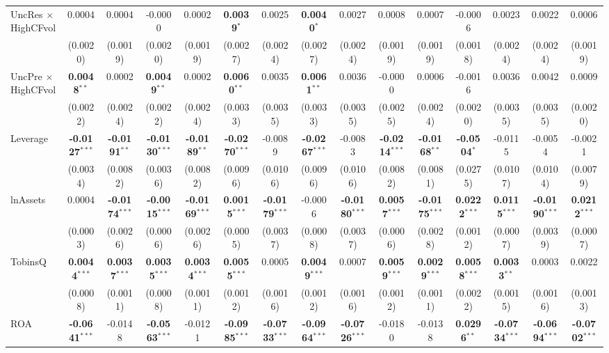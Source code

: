 \documentclass[11pt,a4paper]{article}
\begin{document}
\begin{table}[htbp]
\begin{tabular}{lcccccccccccccc}
UncRes $\times$ HighCFvol & 0.0004 & 0.0004 & -0.0000 & 0.0002 & \textbf{0.0039}$^{*}$ & 0.0025 & \textbf{0.0040}$^{*}$ & 0.0027 & 0.0008 & 0.0007 & -0.0006 & 0.0023 & 0.0022 & 0.0006 \\
 & (0.0020) & (0.0019) & (0.0020) & (0.0019) & (0.0027) & (0.0024) & (0.0027) & (0.0024) & (0.0019) & (0.0019) & (0.0018) & (0.0024) & (0.0024) & (0.0019) \\
UncPre $\times$ HighCFvol & \textbf{0.0048}$^{**}$ & 0.0002 & \textbf{0.0049}$^{**}$ & 0.0002 & \textbf{0.0060}$^{**}$ & 0.0035 & \textbf{0.0061}$^{**}$ & 0.0036 & -0.0000 & 0.0006 & -0.0016 & 0.0036 & 0.0042 & 0.0009 \\
 & (0.0022) & (0.0024) & (0.0022) & (0.0024) & (0.0033) & (0.0035) & (0.0033) & (0.0035) & (0.0025) & (0.0024) & (0.0020) & (0.0035) & (0.0035) & (0.0020) \\
\midrule
Leverage & \textbf{-0.0127}$^{***}$ & \textbf{-0.0191}$^{**}$ & \textbf{-0.0130}$^{***}$ & \textbf{-0.0189}$^{**}$ & \textbf{-0.0270}$^{***}$ & -0.0089 & \textbf{-0.0267}$^{***}$ & -0.0083 & \textbf{-0.0214}$^{***}$ & \textbf{-0.0168}$^{**}$ & \textbf{-0.0504}$^{*}$ & -0.0115 & -0.0054 & -0.0021 \\
 & (0.0034) & (0.0082) & (0.0036) & (0.0082) & (0.0096) & (0.0106) & (0.0096) & (0.0106) & (0.0082) & (0.0081) & (0.0275) & (0.0107) & (0.0104) & (0.0079) \\
lnAssets & 0.0004 & \textbf{-0.0174}$^{***}$ & \textbf{-0.0015}$^{***}$ & \textbf{-0.0169}$^{***}$ & \textbf{0.0015}$^{***}$ & \textbf{-0.0179}$^{***}$ & -0.0006 & \textbf{-0.0180}$^{***}$ & \textbf{0.0057}$^{***}$ & \textbf{-0.0175}$^{***}$ & \textbf{0.0222}$^{***}$ & \textbf{0.0115}$^{***}$ & \textbf{-0.0190}$^{***}$ & \textbf{0.0212}$^{***}$ \\
 & (0.0003) & (0.0026) & (0.0006) & (0.0026) & (0.0005) & (0.0037) & (0.0008) & (0.0037) & (0.0006) & (0.0028) & (0.0012) & (0.0007) & (0.0039) & (0.0007) \\
TobinsQ & \textbf{0.0044}$^{***}$ & \textbf{0.0037}$^{***}$ & \textbf{0.0035}$^{***}$ & \textbf{0.0034}$^{***}$ & \textbf{0.0055}$^{***}$ & 0.0005 & \textbf{0.0049}$^{***}$ & 0.0007 & \textbf{0.0059}$^{***}$ & \textbf{0.0029}$^{***}$ & \textbf{0.0058}$^{***}$ & \textbf{0.0033}$^{**}$ & 0.0003 & 0.0022 \\
 & (0.0008) & (0.0011) & (0.0008) & (0.0011) & (0.0012) & (0.0016) & (0.0012) & (0.0016) & (0.0012) & (0.0011) & (0.0022) & (0.0015) & (0.0016) & (0.0013) \\
ROA & \textbf{-0.0641}$^{***}$ & -0.0148 & \textbf{-0.0563}$^{***}$ & -0.0121 & \textbf{-0.0985}$^{***}$ & \textbf{-0.0733}$^{***}$ & \textbf{-0.0964}$^{***}$ & \textbf{-0.0726}$^{***}$ & -0.0180 & -0.0138 & \textbf{0.0296}$^{**}$ & \textbf{-0.0734}$^{***}$ & \textbf{-0.0694}$^{***}$ & \textbf{-0.0702}$^{***}$ \\

\end{tabular}
\end{table}
\end{document}
